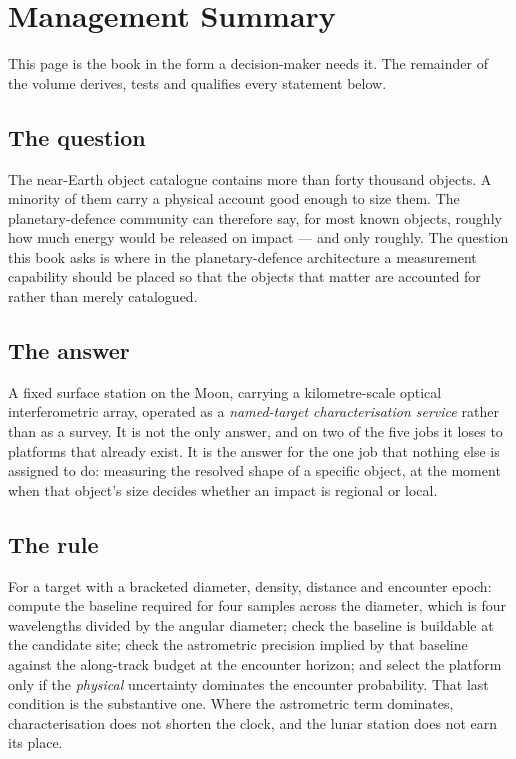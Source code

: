 \chapter*{Management Summary}
\thispagestyle{plain}

This page is the book in the form a decision-maker needs it. The remainder of
the volume derives, tests and qualifies every statement below.

\section*{The question}

The near-Earth object catalogue contains more than forty thousand objects. A
minority of them carry a physical account good enough to size them. The
planetary-defence community can therefore say, for most known objects, roughly
how much energy would be released on impact --- and only roughly. The
question this book asks is where in the planetary-defence architecture a
measurement capability should be placed so that the objects that matter are
accounted for rather than merely catalogued.

\section*{The answer}

A fixed surface station on the Moon, carrying a kilometre-scale optical
interferometric array, operated as a \emph{named-target characterisation
service} rather than as a survey. It is not the only answer, and on two of the
five jobs it loses to platforms that already exist. It is the answer for the
one job that nothing else is assigned to do: measuring the resolved shape of a
specific object, at the moment when that object's size decides whether an
impact is regional or local.

\section*{The rule}

For a target with a bracketed diameter, density, distance and encounter epoch:
compute the baseline required for four samples across the diameter, which is
four wavelengths divided by the angular diameter; check the baseline is
buildable at the candidate site; check the astrometric precision implied by
that baseline against the along-track budget at the encounter horizon; and
select the platform only if the \emph{physical} uncertainty dominates the
encounter probability. That last condition is the substantive one. Where the
astrometric term dominates, characterisation does not shorten the clock, and
the lunar station does not earn its place.

